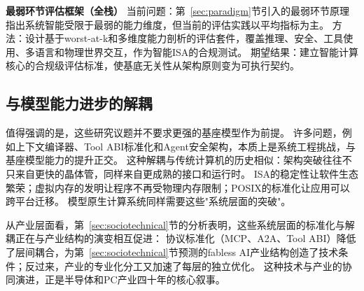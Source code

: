 \textbf{最弱环节评估框架（全栈）}
当前问题：第~\ref{sec:paradigm}节引入的最弱环节原理指出系统智能受限于最弱的能力维度，但当前的评估实践以平均指标为主。
方法：设计基于worst-at-k和多维度能力剖析的评估套件，覆盖推理、安全、工具使用、多语言和物理世界交互，作为智能ISA的合规测试。
期望结果：建立智能计算核心的合规级评估标准，使基底无关性从架构原则变为可执行契约。

\subsection{与模型能力进步的解耦}

值得强调的是，这些研究议题并不要求更强的基座模型作为前提。
许多问题，例如上下文编译器、Tool ABI标准化和Agent安全架构，本质上是系统工程挑战，与基座模型能力的提升正交。
这种解耦与传统计算机的历史相似：架构突破往往不只来自更快的晶体管，同样来自更成熟的接口和运行时。
ISA的稳定性让软件生态繁荣；虚拟内存的发明让程序不再受物理内存限制；POSIX的标准化让应用可以跨平台迁移。
模型原生计算系统同样需要这些"系统层面的突破"。

从产业层面看，第~\ref{sec:sociotechnical}节的分析表明，这些系统层面的标准化与解耦正在与产业结构的演变相互促进：
协议标准化（MCP、A2A、Tool ABI）降低了层间耦合，为第~\ref{sec:sociotechnical}节预测的fabless AI产业结构创造了技术条件；反过来，产业的专业化分工又加速了每层的独立优化。
这种技术与产业的协同演进，正是半导体和PC产业四十年的核心叙事。

